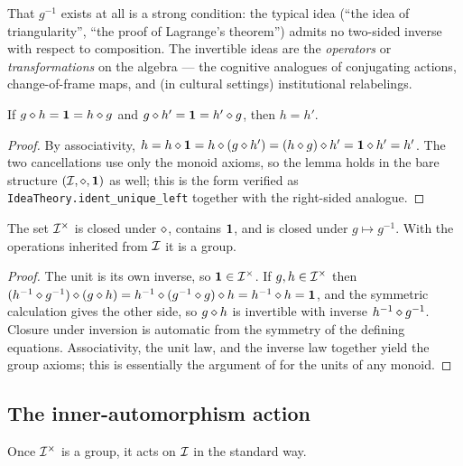 That $g^{-1}$ exists at all is a strong condition: the typical idea
(``the idea of triangularity'', ``the proof of Lagrange's theorem'')
admits no two-sided inverse with respect to composition. The invertible
ideas are the \emph{operators} or \emph{transformations} on the algebra
--- the cognitive analogues of conjugating actions, change-of-frame
maps, and (in cultural settings) institutional relabelings.

\begin{lemma}\label{lem:inv-unique}
If $g\mathbin{\diamond} h=\mathbf{1}=h\mathbin{\diamond} g$ and $g\mathbin{\diamond} h'=\mathbf{1}=h'\mathbin{\diamond} g$,
then $h=h'$.
\end{lemma}

\begin{proof}
By associativity, $h = h\mathbin{\diamond}\mathbf{1} = h\mathbin{\diamond}(g\mathbin{\diamond} h') =
(h\mathbin{\diamond} g)\mathbin{\diamond} h' = \mathbf{1}\mathbin{\diamond} h' = h'$. The two cancellations
use only the monoid axioms, so the lemma holds in the bare structure
$(\mathcal{I},\mathbin{\diamond},\mathbf{1})$ as well; this is the form verified as
\texttt{IdeaTheory.ident\_unique\_left} together with the right-sided
analogue.
\end{proof}

\begin{proposition}\label{prop:inv-group}
The set $\mathcal{I}^{\times}$ is closed under $\mathbin{\diamond}$, contains $\mathbf{1}$,
and is closed under $g\mapsto g^{-1}$. With the operations inherited
from $\mathcal{I}$ it is a group.
\end{proposition}

\begin{proof}
The unit is its own inverse, so $\mathbf{1}\in\mathcal{I}^{\times}$. If
$g,h\in\mathcal{I}^{\times}$ then $(h^{-1}\mathbin{\diamond} g^{-1})\mathbin{\diamond}
(g\mathbin{\diamond} h)= h^{-1}\mathbin{\diamond}(g^{-1}\mathbin{\diamond} g)\mathbin{\diamond} h =
h^{-1}\mathbin{\diamond} h = \mathbf{1}$, and the symmetric calculation gives the other
side, so $g\mathbin{\diamond} h$ is invertible with inverse $h^{-1}\mathbin{\diamond}
g^{-1}$. Closure under inversion is automatic from the symmetry of the
defining equations. Associativity, the unit law, and the inverse law
together yield the group axioms; this is essentially the argument of
\cite{Bourbaki1989} for the units of any monoid.
\end{proof}

\subsection*{The inner-automorphism action}

Once $\mathcal{I}^{\times}$ is a group, it acts on $\mathcal{I}$ in the standard
way.

